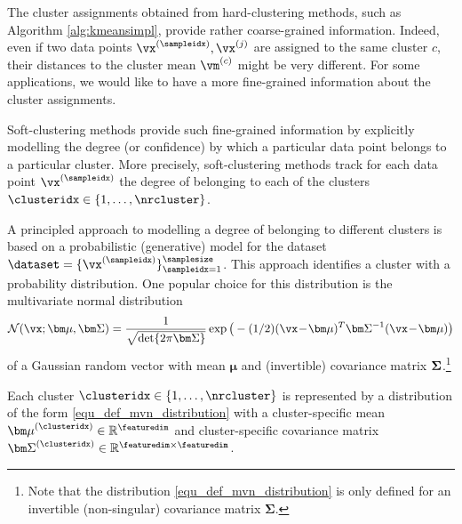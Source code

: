 \documentclass[12pt]{report}
\begin{document}
The cluster assignments obtained from hard-clustering 
methods, such as Algorithm \ref{alg:kmeansimpl}, provide 
rather coarse-grained information. Indeed, even if two data 
points $\vx^{(\sampleidx)}, \vx^{(j)}$ are assigned to the 
same cluster $c$, their distances to the cluster mean $\vm^{(c)}$ 
might be very different. For some applications, we would 
like to have a more fine-grained information about the cluster 
assignments. 

Soft-clustering methods provide such fine-grained information 
by explicitly modelling the degree (or confidence) by which 
a particular data point belongs to a particular cluster. More 
precisely, soft-clustering methods track for each data point 
$\vx^{(\sampleidx)}$ the degree of belonging to each of the 
clusters $\clusteridx \in \{1,\ldots,\nrcluster\}$.  

A principled approach to modelling a degree of belonging to 
different clusters is based on a probabilistic (generative) model 
for the dataset $\dataset = \{ \vx^{(\sampleidx)} \}_{\sampleidx=1}^{\samplesize}$. 
This approach identifies a cluster with a probability distribution. 
One popular choice for this distribution is the multivariate normal 
distribution 
\begin{equation}
\label{equ_def_mvn_distribution}
 \mathcal{N} (\vx ; {\bm \mu}, {\bm \Sigma}) = \frac{1}{\sqrt{{\rm det } \{ 2 \pi  {\bm \Sigma} \} }} \exp\big( - (1/2) (\vx\!-\!{\bm \mu})^{T}  {\bm \Sigma}^{-1} (\vx\!-\!{\bm \mu})  \big)
\end{equation} 
of a Gaussian random vector with mean ${\bm \mu}$ and (invertible) covariance 
matrix ${\bf \Sigma}$.\footnote{Note that the distribution \eqref{equ_def_mvn_distribution} 
is only defined for an invertible (non-singular) covariance matrix ${\bm \Sigma}$.}

Each cluster $\clusteridx \in \{1,\ldots,\nrcluster\}$ is represented by a distribution 
of the form \eqref{equ_def_mvn_distribution} with a cluster-specific mean 
${\bm \mu}^{(\clusteridx)} \in \mathbb{R}^{\featuredim}$ and cluster-specific 
covariance matrix ${\bm \Sigma}^{(\clusteridx)} \in \mathbb{R}^{\featuredim \times \featuredim}$. 
\end{document}
